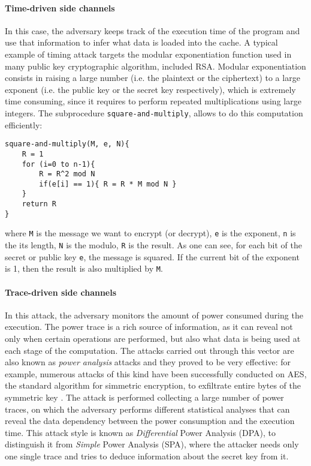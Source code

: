 \documentclass[12pt,a4paper]{book}
\theoremstyle{definition}
\begin{document}
	\paragraph{Time-driven side channels} In this case, the adversary keeps track of the execution time of the program and use that information to infer what data is loaded into the cache. 
	A typical example of timing attack targets the modular exponentiation function used in many public key cryptographic algorithm, included RSA. Modular exponentiation consists in raising a large number (i.e. the plaintext or the ciphertext) to a large exponent (i.e. the public key or the secret key respectively), which is extremely time consuming, since it requires to perform repeated multiplications using large integers. The subprocedure \texttt{square-and-multiply}, allows to do this computation efficiently:
	\begin{lstlisting}
square-and-multiply(M, e, N){
	R = 1
	for (i=0 to n-1){
		R = R^2 mod N
		if(e[i] == 1){ R = R * M mod N }
	}	
	return R
}
	\end{lstlisting}
	where \texttt{M} is the message we want to encrypt (or decrypt), \texttt{e} is the exponent, \texttt{n} is the its length, \texttt{N} is the modulo, \texttt{R} is the result. As one can see, for each bit of the secret or public key \texttt{e}, the message is squared. If the current bit of the exponent is 1, then the result is also multiplied by \texttt{M}. 
 	\paragraph{Trace-driven side channels} In this attack, the adversary monitors the amount of power consumed during the execution. The power trace is a rich source of information, as it can reveal not only when certain operations are performed, but also what data is being used at each stage of the computation. The attacks carried out through this vector are also known as \textit{power analysis} attacks and they proved to be very effective: for example, numerous attacks of this kind have been successfully conducted on AES, the standard algorithm for simmetric encryption, to exfiltrate entire bytes of the symmetric key \cite{Buchanan2017} \cite{Mangard2003} \cite{Mangard2010} \cite{Oswald2004}. The attack is performed collecting a large number of power traces, on which the adversary performs different statistical analyses that can reveal the data dependency between the power consumption and the execution time. This attack style is known as \textit{Differential} Power Analysis (DPA), to distinguish it from \textit{Simple} Power Analysis (SPA), where the attacker needs only one single trace and tries to deduce information about the secret key from it.
\end{document}
